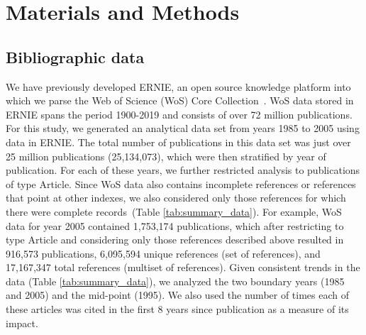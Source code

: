\documentclass[NETN]{stjour}
\begin{document}
\section{Materials and Methods}

\subsection{Bibliographic data} We have previously developed ERNIE, an open source knowledge platform into which we parse the Web of Science (WoS) Core Collection~\citep{Keserci371955}. WoS data stored in ERNIE spans the period 1900-2019 and consists of over 72 million publications. For this study, we generated an analytical data set from years 1985 to 2005 using data in ERNIE. The total number of publications in this data set was just over 25 million publications (25,134,073), which were then stratified by year of publication. For each of these years, we further restricted analysis to publications of type Article. Since WoS data also contains incomplete references or references that point at other indexes, we also considered only those references for which there were complete records~(Table \ref{tab:summary_data}). For example, WoS data for year 2005 contained 1,753,174 publications, which after restricting to type Article and considering only those references described above resulted in 916,573 publications, 6,095,594 unique references (set of references), and 17,167,347 total references (multiset of references). Given consistent trends in the data (Table \ref{tab:summary_data}), we analyzed the two boundary years (1985 and 2005) and the mid-point (1995). We also used the number of times each of these articles was cited in the first 8 years since publication as a measure of its impact.
\vspace{-4mm}
\end{document}
